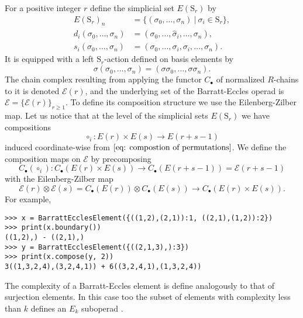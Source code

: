 \documentclass{amsart}
\renewcommand{\S}{\mathrm{S}}
\newcommand{\chains}{C_\bullet}
\begin{document}
For a positive integer $r$ define the simplicial set $E(\S_r)$ by
\begin{align*}
E(\S_r)_n &= \{ (\sigma_0, \dots, \sigma_n)\ |\ \sigma_i \in \S_r\}, \\
d_i(\sigma_0, \dots, \sigma_n) &= (\sigma_0, \dots, \widehat{\sigma}_i, \dots, \sigma_n), \\
s_i(\sigma_0, \dots, \sigma_n) &= (\sigma_0, \dots, \sigma_i, \sigma_i, \dots, \sigma_n).
\end{align*}
It is equipped with a left $\S_r$-action defined on basis elements by
\begin{equation*}
\sigma (\sigma_0, \dots, \sigma_n) = (\sigma \sigma_0, \dots, \sigma \sigma_n).
\end{equation*}
The chain complex resulting from applying the functor $\chains$ of normalized $R$-chains to it is denoted $\mathcal E(r)$, and the underlying set of the Barratt-Eccles operad is $\mathcal E = \{\mathcal E(r)\}_{r \geq 1}$.
To define its composition structure we use the Eilenberg-Zilber map.
Let us notice that at the level of the simplicial sets $E(\S_r)$ we have compositions
\begin{equation*}
\circ_i \colon E(r) \times E(s) \to E(r + s - 1)
\end{equation*}
induced coordinate-wise from $\eqref{eq: compostion of permutations}$.
We define the composition maps on $\mathcal E$ by precomposing
\begin{equation*}
\chains(\circ_i) \colon \chains(E(r) \times E(s))
\longrightarrow
\chains(E(r + s - 1)) = \mathcal E(r+s-1)
\end{equation*}
with the Eilenberg-Zilber map
\begin{equation*}
\mathcal E(r) \otimes \mathcal E(s) =
\chains(E(r)) \otimes \chains(E(s))
\longrightarrow
\chains(E(r) \times E(s)).
\end{equation*}
For example,

\begin{Verbatim}[frame=lines, samepage=true]
>>> x = BarrattEcclesElement({((1,2),(2,1)):1, ((2,1),(1,2)):2})
>>> print(x.boundary())
((1,2),) - ((2,1),)
>>> y = BarrattEcclesElement({((2,1,3),):3})
>>> print(x.compose(y, 2))
3((1,3,2,4),(3,2,4,1)) + 6((3,2,4,1),(1,3,2,4))
\end{Verbatim}

The complexity of a Barratt-Eccles element is define analogously to that of surjection elements.
In this case too the subset of elements with complexity less than $k$ defines an $E_k$ suboperad \cite{BergerFresse04}.
\end{document}
